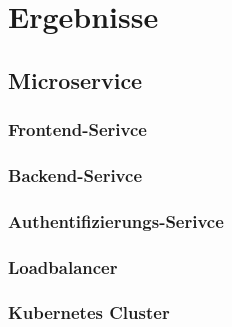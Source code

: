 
\chapter{Ergebnisse}
\section{Microservice}
\subsection{Frontend-Serivce}
\subsection{Backend-Serivce}
\subsection{Authentifizierungs-Serivce}
\subsection{Loadbalancer}
\subsection{Kubernetes Cluster}
